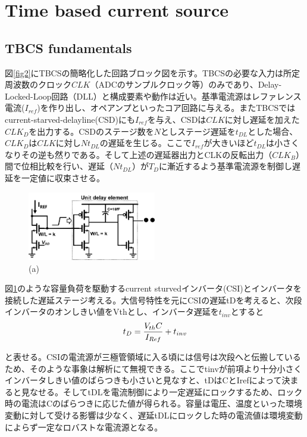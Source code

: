\documentclass[letterpaper, 10 pt, conference]{ieeeconf}  %
\begin{document}
\section{Time based current source}
\subsection{TBCS fundamentals}

図\ref{fig2}にTBCSの簡略化した回路ブロック図を示す。TBCSの必要な入力は所定周波数のクロック$CLK$（ADCのサンプルクロック等）のみであり、Delay-Locked-Loop回路（DLL）と構成要素や動作は近い。基準電流源はレファレンス電流($I_{ref}$)を作り出し、オペアンプといったコア回路に与える。またTBCSではcurrent-starved-delayline(CSD)にも$I_{ref}$を与え、CSDは$CLK$に対し遅延を加えた$CLK_D$を出力する。CSDのステージ数を$N$としステージ遅延を$t_{DL}$とした場合、$CLK_D$は$CLK$に対し$Nt_{DL}$の遅延を生じる。ここで$I_{ref}$が大きいほど$t_{DL}$は小さくなりその逆も然りである。そして上述の遅延器出力とCLKの反転出力（$CLK_B$）間で位相比較を行い、遅延（$Nt_{DL}$）が$T_D$に漸近するよう基準電流源を制御し遅延を一定値に収束させる。


\begin{figure}[!]
\centering
 \includegraphics[width=0.5\textwidth]{figs/inv.png}
  \caption{(a) 
}
\label{inv}
\end{figure}

図\ref{inv}のような容量負荷を駆動するcurrent sturvedインバータ(CSI)\cite{mroszczyk2014tunable}とインバータを接続した遅延ステージ考える。大信号特性を元にCSIの遅延tDを考えると、次段インバータのオンしきい値をVthとし、インバータ遅延を$t_{inv}$とすると
\begin{eqnarray}
    \centering
    t_D = \frac{V_{th}C}{I_{Ref}}+t_{inv}
    \label{delay}
\end{eqnarray}

と表せる。CSIの電流源が三極管領域に入る頃には信号は次段へと伝搬しているため、そのような事象は解析にて無視できる。ここでtinvが前項より十分小さくインバータしきい値のばらつきも小さいと見なすと、tDはCとIrefによって決まると見なせる。そしてtDLを電流制御により一定遅延にロックするため、ロック時の電流はCのばらつきに応じた値が得られる。容量は電圧、温度といった環境変動に対して受ける影響は少なく、遅延tDLにロックした時の電流値は環境変動によらず一定なロバストな電流源となる。
\end{document}
